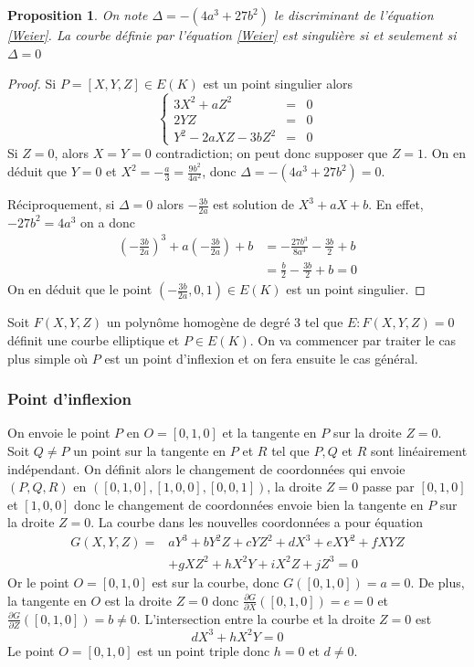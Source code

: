 \documentclass{article}
\newtheorem{proposition}{Proposition}
\begin{document}
\begin{proposition}
On note $\Delta = -(4a^3+27b^2)$ le discriminant de l'équation \ref{Weier}.
La courbe définie par l'équation \ref{Weier} est singulière si et seulement si $\Delta = 0$
\end{proposition}

\begin{proof}
Si $P=[X,Y,Z]\in E(K)$ est un point singulier alors
\begin{equation*}
\left\lbrace
\begin{array}{lcl}
3X^2 + aZ^2 &=& 0\\
2YZ &=& 0 \\
Y^2 - 2aXZ - 3bZ^2 &=& 0
\end{array}\right.
\end{equation*}
Si $Z=0$, alors $X=Y=0$ contradiction; on peut donc supposer que $Z=1$. On en déduit que $Y=0$ et 
$X^2 = -\frac{a}{3} = \frac{9b^2}{4a^2}$, donc $\Delta = -(4a^3+27b^2) = 0$.

Réciproquement, si $\Delta = 0$ alors $-\frac{3b}{2a}$ est solution de $X^3+aX+b$. En effet, $-27b^2=4a^3$
on a donc
\begin{align*}
(-\frac{3b}{2a})^3 + a(-\frac{3b}{2a}) + b &=  -\frac{27b^3}{8a^3} -\frac{3b}{2} + b\\
			   &= \frac{b}{2} -\frac{3b}{2} + b = 0
\end{align*}
On en déduit que le point $(-\frac{3b}{2a}, 0, 1) \in E(K)$ est un point singulier.
\end{proof}

Soit $F(X,Y,Z)$ un polynôme homogène de degré $3$ tel que $E: F(X,Y,Z)=0$ définit une courbe elliptique et
$P\in E(K)$. On va commencer par traiter le cas plus simple où $P$ est un point d'inflexion et on fera ensuite
le cas général.

\subsubsection{Point d'inflexion}
On envoie le point $P$ en $O=[0,1,0]$ et la tangente en $P$ sur la droite $Z=0$. Soit $Q\neq P$ un point sur la tangente
en $P$ et $R$ tel que $P,Q$ et $R$ sont linéairement indépendant. On définit alors le changement de coordonnées qui envoie $(P,Q,R)$
en $([0,1,0], [1,0,0], [0,0,1])$, la droite $Z=0$ passe par $[0,1,0]$ et $[1,0,0]$ donc le changement de coordonnées
envoie bien la tangente en $P$ sur la droite $Z=0$. La courbe dans les nouvelles coordonnées a pour équation
\begin{align*}
G(X,Y,Z) = &aY^3 + bY^2Z + cYZ^2 + dX^3 + eXY^2 + fXYZ \\
			& + gXZ^2 + hX^2Y + iX^2Z + jZ^3 = 0
\end{align*}
Or le point $O=[0,1,0]$ est sur la courbe, donc $G([0,1,0])=a=0$. De plus, la tangente en $O$ est la droite $Z=0$
donc $\frac{\partial G}{\partial X}([0,1,0])=e=0$ et $\frac{\partial G}{\partial Z}([0,1,0])=b\neq 0$.
L'intersection entre la courbe et la droite $Z=0$ est
\begin{equation*}
dX^3 + hX^2Y = 0
\end{equation*}
Le point $O=[0,1,0]$ est un point triple donc $h=0$ et $d\neq0$.
\end{document}
